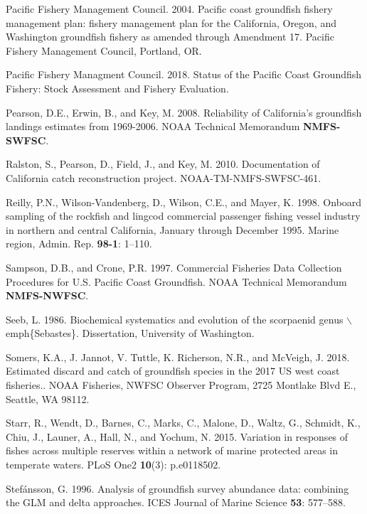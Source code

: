 \documentclass[12pt,]{article}
\begin{document}
\hypertarget{ref-PFMC2004}{}
Pacific Fishery Management Council. 2004. Pacific coast groundfish
fishery management plan: fishery management plan for the California,
Oregon, and Washington groundfish fishery as amended through Amendment
17. Pacific Fishery Management Council, Portland, OR.

\hypertarget{ref-PSMFC2018}{}
Pacific Fishery Managment Council. 2018. Status of the Pacific Coast
Groundfish Fishery: Stock Assessment and Fishery Evaluation.

\hypertarget{ref-Pearson2008}{}
Pearson, D.E., Erwin, B., and Key, M. 2008. Reliability of California's
groundfish landings estimates from 1969-2006. NOAA Technical Memorandum
\textbf{NMFS-SWFSC}.

\hypertarget{ref-Ralston2010}{}
Ralston, S., Pearson, D., Field, J., and Key, M. 2010. Documentation of
California catch reconstruction project. NOAA-TM-NMFS-SWFSC-461.

\hypertarget{ref-Reilly1998}{}
Reilly, P.N., Wilson-Vandenberg, D., Wilson, C.E., and Mayer, K. 1998.
Onboard sampling of the rockfish and lingcod commercial passenger
fishing vessel industry in northern and central California, January
through December 1995. Marine region, Admin. Rep. \textbf{98-1}: 1--110.

\hypertarget{ref-Sampson1997}{}
Sampson, D.B., and Crone, P.R. 1997. Commercial Fisheries Data
Collection Procedures for U.S. Pacific Coast Groundfish. NOAA Technical
Memorandum \textbf{NMFS-NWFSC}.

\hypertarget{ref-Seeb1986}{}
Seeb, L. 1986. Biochemical systematics and evolution of the scorpaenid
genus \(\backslash\)emph\{Sebastes\}. Dissertation, University of
Washington.

\hypertarget{ref-Somers2018}{}
Somers, K.A., J. Jannot, V. Tuttle, K. Richerson, N.R., and McVeigh, J.
2018. Estimated discard and catch of groundfish species in the 2017 US
west coast fisheries.. NOAA Fisheries, NWFSC Observer Program, 2725
Montlake Blvd E., Seattle, WA 98112.

\hypertarget{ref-Starr2015}{}
Starr, R., Wendt, D., Barnes, C., Marks, C., Malone, D., Waltz, G.,
Schmidt, K., Chiu, J., Launer, A., Hall, N., and Yochum, N. 2015.
Variation in responses of fishes across multiple reserves within a
network of marine protected areas in temperate waters. PLoS One2
\textbf{10}(3): p.e0118502.

\hypertarget{ref-Stefansson1996}{}
Stefánsson, G. 1996. Analysis of groundfish survey abundance data:
combining the GLM and delta approaches. ICES Journal of Marine Science
\textbf{53}: 577--588.
\end{document}
